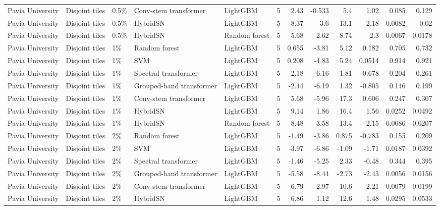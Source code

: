 \begin{table}
\begin{tabular}{lllllrrrrrrr}
Pavia University & Disjoint tiles & 0.5\% & Conv-stem transformer & LightGBM & 5 & 2.43 & -0.533 & 5.4 & 1.02 & 0.085 & 0.129 \\
Pavia University & Disjoint tiles & 0.5\% & HybridSN & LightGBM & 5 & 8.37 & 3.6 & 13.1 & 2.18 & 0.0082 & 0.02 \\
Pavia University & Disjoint tiles & 0.5\% & HybridSN & Random forest & 5 & 5.68 & 2.62 & 8.74 & 2.3 & 0.0067 & 0.0178 \\
Pavia University & Disjoint tiles & 1\% & Random forest & LightGBM & 5 & 0.655 & -3.81 & 5.12 & 0.182 & 0.705 & 0.732 \\
Pavia University & Disjoint tiles & 1\% & SVM & LightGBM & 5 & 0.208 & -4.83 & 5.24 & 0.0514 & 0.914 & 0.921 \\
Pavia University & Disjoint tiles & 1\% & Spectral transformer & LightGBM & 5 & -2.18 & -6.16 & 1.81 & -0.678 & 0.204 & 0.261 \\
Pavia University & Disjoint tiles & 1\% & Grouped-band transformer & LightGBM & 5 & -2.44 & -6.19 & 1.32 & -0.805 & 0.146 & 0.199 \\
Pavia University & Disjoint tiles & 1\% & Conv-stem transformer & LightGBM & 5 & 5.68 & -5.96 & 17.3 & 0.606 & 0.247 & 0.307 \\
Pavia University & Disjoint tiles & 1\% & HybridSN & LightGBM & 5 & 9.14 & 1.86 & 16.4 & 1.56 & 0.0252 & 0.0492 \\
Pavia University & Disjoint tiles & 1\% & HybridSN & Random forest & 5 & 8.48 & 3.58 & 13.4 & 2.15 & 0.0086 & 0.0207 \\
Pavia University & Disjoint tiles & 2\% & Random forest & LightGBM & 5 & -1.49 & -3.86 & 0.875 & -0.783 & 0.155 & 0.209 \\
Pavia University & Disjoint tiles & 2\% & SVM & LightGBM & 5 & -3.97 & -6.86 & -1.09 & -1.71 & 0.0187 & 0.0392 \\
Pavia University & Disjoint tiles & 2\% & Spectral transformer & LightGBM & 5 & -1.46 & -5.25 & 2.33 & -0.48 & 0.344 & 0.395 \\
Pavia University & Disjoint tiles & 2\% & Grouped-band transformer & LightGBM & 5 & -5.58 & -8.44 & -2.73 & -2.43 & 0.0056 & 0.0156 \\
Pavia University & Disjoint tiles & 2\% & Conv-stem transformer & LightGBM & 5 & 6.79 & 2.97 & 10.6 & 2.21 & 0.0079 & 0.0199 \\
Pavia University & Disjoint tiles & 2\% & HybridSN & LightGBM & 5 & 6.86 & 1.12 & 12.6 & 1.48 & 0.0295 & 0.0533 \\

\end{tabular}
\end{table}
